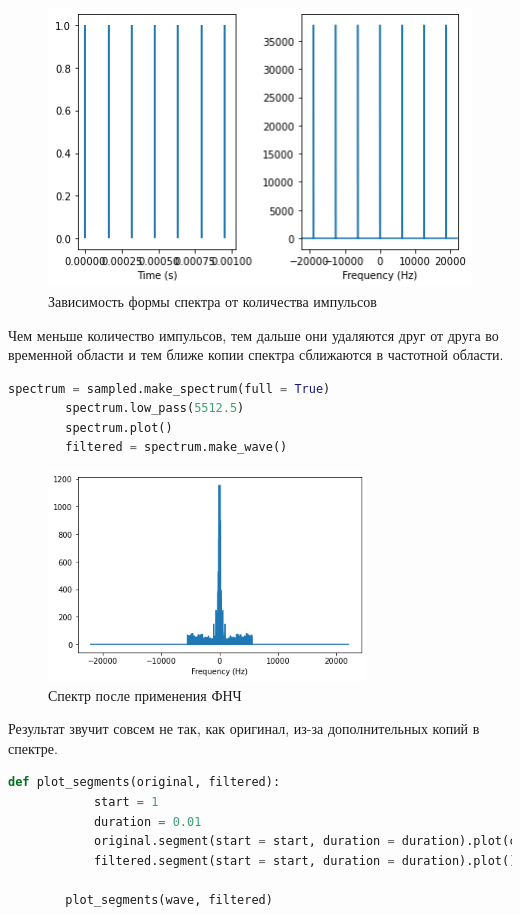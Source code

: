 \documentclass[a4paper, 12pt]{report}
\begin{document}
	\begin{figure}[H]
		\centering
		\includegraphics[width=1.0\textwidth]{samp5.png}
		\caption{Зависимость формы спектра от количества импульсов}
		\label{fig:samp5}
	\end{figure}
	Чем меньше количество импульсов, тем дальше они удаляются друг от друга во временной области и тем ближе копии спектра сближаются в частотной области.
	\begin{lstlisting}[language=Python,caption=Применим ФНЧ]
		spectrum = sampled.make_spectrum(full = True)
		spectrum.low_pass(5512.5)
		spectrum.plot()
		filtered = spectrum.make_wave()
	\end{lstlisting}
	\begin{figure}[H]
		\centering
		\includegraphics[width=0.75\textwidth]{samp6.png}
		\caption{Спектр после применения ФНЧ}
		\label{fig:samp6}
	\end{figure}
	Результат звучит совсем не так, как оригинал, из-за дополнительных копий в спектре.
	\begin{lstlisting}[language=Python,caption=Сравнение исходного и полученного сигнала]
		def plot_segments(original, filtered):
			start = 1
			duration = 0.01
			original.segment(start = start, duration = duration).plot(color = 'gray')
			filtered.segment(start = start, duration = duration).plot()

		plot_segments(wave, filtered)
	\end{lstlisting}
\end{document}
